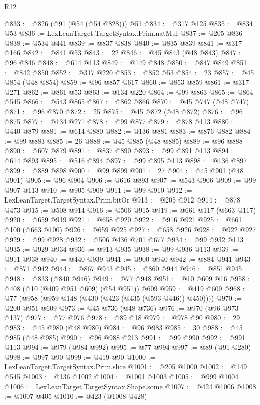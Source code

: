 \begin{lexlean}{R12}
\begin{coremodule}
@833 := @826 (@91 (@54 (@54 @828))) @51
@834 := @317 @125
@835 := @834 @53
@836 := LexLeanTarget.TargetSyntax.Prim.natMul
@837 := @205 @836
@838 := @534 @441
@839 := @837 @838
@840 := @835 @839
@841 := @317 @166
@842 := @841 @53
@843 := 22
@846 := @45 @843 (@48 @843)
@847 := @96 @846
@848 := @614 @113
@849 := @149 @848
@850 := @847 @849
@851 := @842 @850
@852 := @317 @220
@853 := @852 @53
@854 := 23
@857 := @45 @854 (@48 @854)
@859 := @96 @857 @617
@860 := @853 @859
@861 := @317 @271
@862 := @861 @53
@863 := @134 @220
@864 := @99 @863
@865 := @864 @545
@866 := @543 @865
@867 := @862 @866
@870 := @45 @747 (@48 @747)
@871 := @96 @870
@872 := 25
@875 := @45 @872 (@48 @872)
@876 := @96 @875
@877 := @134 @271
@878 := @99 @877
@879 := @878 @113
@880 := @440 @879
@881 := @614 @880
@882 := @136 @881
@883 := @876 @882
@884 := @99 @883
@885 := 26
@888 := @45 @885 (@48 @885)
@889 := @96 @888
@890 := @607 @879
@891 := @837 @890
@893 := @99 @891 @113
@894 := @614 @893
@895 := @516 @894
@897 := @99 @895 @113
@898 := @136 @897
@899 := @889 @898
@900 := @99 @899
@901 := 27
@904 := @45 @901 (@48 @901)
@905 := @96 @904
@906 := @616 @893
@907 := @543 @906
@909 := @99 @907 @113
@910 := @905 @909
@911 := @99 @910
@912 := LexLeanTarget.TargetSyntax.Prim.bitOr
@913 := @205 @912
@914 := @878 @473
@915 := @508 @914
@916 := @506 @915
@919 := @661 @117 (@663 @117)
@920 := @659 @919
@921 := @658 @920
@922 := @916 @921
@925 := @661 @100 (@663 @100)
@926 := @659 @925
@927 := @658 @926
@928 := @922 @927
@929 := @99 @928
@932 := @506 @436 @701 @677
@934 := @99 @932 @113
@935 := @929 @934
@936 := @913 @935
@938 := @99 @936 @113
@939 := @911 @938
@940 := @440 @939
@941 := @900 @940
@942 := @884 @941
@943 := @871 @942
@944 := @867 @943
@945 := @860 @944
@946 := @851 @945
@948 := @833 (@840 @946)
@949 := @77 @948
@951 := @10 @609 @16
@958 := @408 (@10 (@409 @951 @609) (@54 @951)) @609
@959 := @419 @609
@968 := @77 (@958 (@959 @148 (@430 (@423 (@435 (@593 @446)) @450))))
@970 := @200 @951 @609
@973 := @45 @736 (@48 @736)
@976 := @970 (@96 @973 @137)
@977 := @77 @976
@978 := @89 @18
@979 := @978 @90
@980 := 29
@983 := @45 @980 (@48 @980)
@984 := @96 @983
@985 := 30
@988 := @45 @985 (@48 @985)
@990 := @96 @988 @213
@991 := @99 @990
@992 := @991 @113
@994 := @979 (@984 @992)
@995 := @77 @994
@997 := @89 (@91 @280)
@998 := @997 @90
@999 := @419 @90
@1000 := LexLeanTarget.TargetSyntax.Prim.slice
@1001 := @205 @1000
@1002 := @149 @545
@1003 := @136 @1002
@1004 := @1001 @1003
@1005 := @999 @1004
@1006 := LexLeanTarget.TargetSyntax.Shape.some
@1007 := @424 @1006
@1008 := @1007 @405
@1010 := @423 (@1008 @428)

\end{coremodule}
\end{lexlean}
